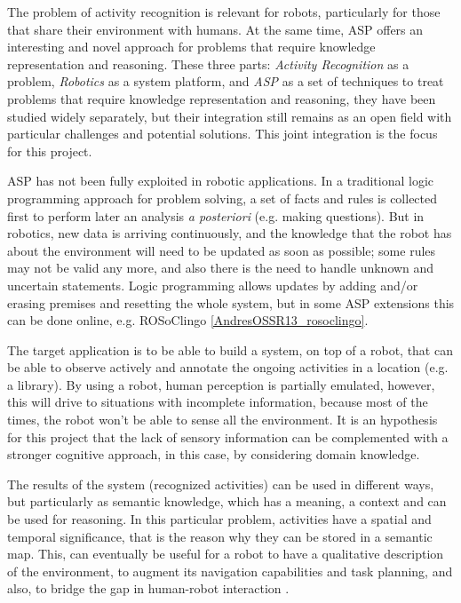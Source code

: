 The problem of activity recognition is relevant for robots, particularly for those that share their environment with humans.
At the same time, ASP offers an interesting and novel approach for problems that require knowledge representation and reasoning.
These three parts: \textit{Activity Recognition} as a problem, \textit{Robotics} as a system platform, and \textit{ASP} as a set of techniques to treat problems that require knowledge representation and reasoning, they have been studied widely separately, but their integration still remains as an open field with particular challenges and potential solutions. 
This joint integration is the focus for this project.

ASP has not been fully exploited in robotic applications.
In a traditional logic programming approach for problem solving, a set of facts and rules is collected first to perform later an analysis \textit{a posteriori} (e.g. making questions).
But in robotics, new data is arriving continuously, and the knowledge that the robot has about the environment will need to be updated as soon as possible; some rules may not be valid any more, and also there is the need to handle unknown and uncertain statements.
Logic programming allows updates by adding and/or erasing premises and resetting the whole system, but in some ASP extensions this can be done online, e.g. ROSoClingo \ref{AndresOSSR13_rosoclingo}.

The target application is to be able to build a system, on top of a robot, that can be able to observe actively and annotate the ongoing activities in a location (e.g. a library). 
By using a robot, human perception is partially emulated, however, this will drive to situations with incomplete information, because most of the times, the robot won't be able to sense all the environment. 
It is an hypothesis for this project that the lack of sensory information can be complemented with a stronger cognitive approach, in this case, by considering domain knowledge.

The results of the system (recognized activities) can be used in different ways, but particularly as semantic knowledge, which has a meaning, a context and can be used for reasoning.
In this particular problem, activities have a spatial and temporal significance, that is the reason why they can be stored in a semantic map.
This, can eventually be useful for a robot to have a qualitative description of the environment, to augment its navigation capabilities and task planning, and also, to bridge the gap in human-robot interaction \citep{Kostavelis2015_SemMapSurv}.

